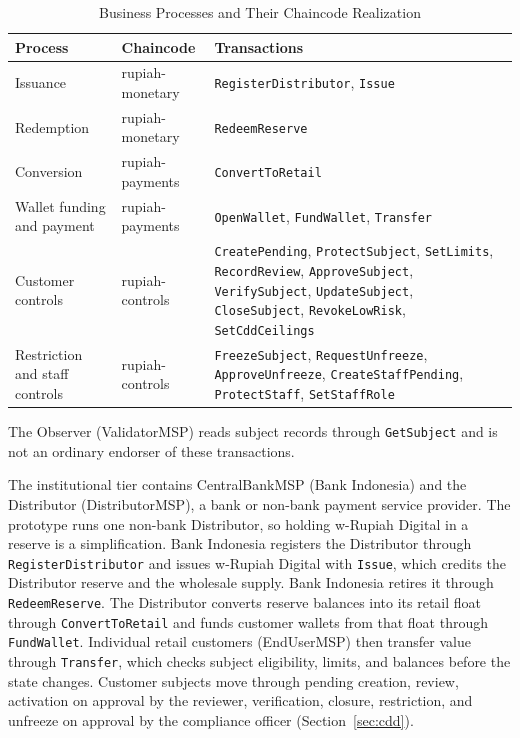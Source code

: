 \documentclass[conference]{IEEEtran}
\begin{document}
\begin{table}[!t]
	\caption{Business Processes and Their Chaincode Realization}
	\label{tab:processes}
	\centering
	\scriptsize
	\setlength{\tabcolsep}{3.5pt}
	\begin{tabular}{l>{\raggedright\arraybackslash}p{2.0cm}>{\raggedright\arraybackslash}p{3.4cm}}
		\toprule
		\textbf{Process} & \textbf{Chaincode} & \textbf{Transactions} \\
		\midrule
		Issuance                         & rupiah-monetary  & \texttt{RegisterDistributor}, \texttt{Issue} \\
		Redemption                      & rupiah-monetary  & \texttt{RedeemReserve} \\
			Conversion                       & rupiah-payments  & \texttt{ConvertToRetail} \\
		Wallet funding and payment       & rupiah-payments  & \texttt{OpenWallet}, \texttt{FundWallet}, \texttt{Transfer} \\
		Customer controls                & rupiah-controls  & \texttt{CreatePending}, \texttt{ProtectSubject}, \texttt{SetLimits}, \texttt{RecordReview}, \texttt{ApproveSubject}, \texttt{VerifySubject}, \texttt{UpdateSubject}, \texttt{CloseSubject}, \texttt{RevokeLowRisk}, \texttt{SetCddCeilings} \\
		Restriction and staff controls   & rupiah-controls  & \texttt{FreezeSubject}, \texttt{RequestUnfreeze}, \texttt{ApproveUnfreeze}, \texttt{CreateStaffPending}, \texttt{ProtectStaff}, \texttt{SetStaffRole} \\
		\bottomrule
	\end{tabular}

	\vspace{2pt}
	{\scriptsize The Observer (ValidatorMSP) reads subject records through
		\texttt{GetSubject} and is not an ordinary endorser of these transactions.}
\end{table}

The institutional tier contains CentralBankMSP (Bank Indonesia) and the Distributor
(DistributorMSP), a bank or non-bank payment service provider. The prototype runs one
non-bank Distributor, so holding w-Rupiah Digital in a reserve is a simplification.
Bank Indonesia registers the Distributor through \texttt{RegisterDistributor} and issues
w-Rupiah Digital with \texttt{Issue}, which credits the Distributor reserve and
the wholesale supply. Bank Indonesia retires it through \texttt{RedeemReserve}. The Distributor
converts reserve balances into its retail float through \texttt{ConvertToRetail} and
funds customer wallets from that float through \texttt{FundWallet}. Individual retail
customers (EndUserMSP) then transfer value
through \texttt{Transfer}, which checks subject eligibility, limits, and balances
before the state changes. Customer subjects move through pending creation,
review, activation on approval by the reviewer, verification, closure, restriction, and unfreeze on approval by the compliance officer
(Section~\ref{sec:cdd}).
\end{document}
